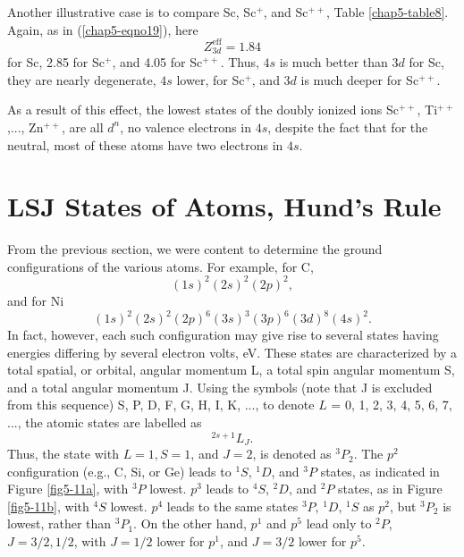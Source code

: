 Another illustrative case is to compare Sc, Sc$^+$, and Sc$^{++}$, 
Table \ref{chap5-table8}.  Again, as in (\ref{chap5-eqno19}), here
\begin{equation}
Z^\mathrm{eff}_{3d} = 1.84
\end{equation}
for Sc, 2.85 for Sc$^+$, and 4.05 for Sc$^{++}$.  Thus, $4s$ is much 
better than $3d$ for Sc, they are nearly degenerate, $4s$ lower, for 
Sc$^+$, and $3d$ is much deeper for Sc$^{++}$.

As a result of this effect, the lowest states of the doubly ionized 
ions Sc$^{++}$, Ti$^{++}$,..., Zn$^{++}$, are all $d^n$, 
no valence electrons in $4s$, despite the fact that for the neutral, most of
these atoms have two electrons in $4s$.

\section{LSJ States of Atoms, Hund's Rule}

From the previous section, we were content to determine the ground configurations
of the various atoms.  For example, for C, 
\begin{equation}
(1s)^2(2s)^2(2p)^2,
\end{equation}
and for Ni 
\begin{equation}
(1s)^2(2s)^2(2p)^6(3s)^3(3p)^6(3d)^8(4s)^2.
\end{equation}
In fact, however, each such configuration may give rise to several
states having energies differing by several electron volts, eV.  These
states are characterized by a total spatial, or orbital, angular
momentum L, a total spin angular momentum S, and a total angular
momentum J.  Using the symbols (note that J is excluded from this
sequence) S, P, D, F, G, H, I, K, ..., to denote $L$ = 0, 1, 2, 3, 4,
5, 6, 7, ..., the atomic states are labelled as
\begin{equation}
^{2s + 1}L_J.
\end{equation}
Thus, the state with $L = 1, S = 1$, and $J = 2$, is denoted as
${^3P}_2$.  The $p^2$ configuration (e.g., C, Si, or Ge) leads to
${^1S}$, ${^1D}$, and ${^3P}$ states, as indicated in Figure
\ref{fig5-11a}, with ${^3P}$ lowest.  $p^3$ leads to ${^4S}$, ${^2D}$,
and ${^2P}$ states, as in Figure \ref{fig5-11b}, with ${^4S}$ lowest.
$p^4$ leads to the same states ${^3P}$, ${^1D}$, ${^1S}$ as $p^2$, but
${^3P}_2$ is lowest, rather than ${^3P}_1$. On the other hand, $p^1$
and $p^5$ lead only to ${^2P}$, $J = 3/2, 1/2$, with $J = 1/2$ lower
for $p^1$, and $J = 3/2$ lower for $p^5$.

